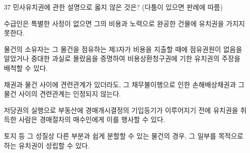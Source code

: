 \begin{question}{37}
민사유치권에 관한 설명으로 옳지 않은 것은? (다툼이 있으면 판례에 따름)
\begin{choices}
  \item 수급인은 특별한 사정이 없으면 그의 비용과 노력으로 완공한 건물에 유치권을 가지지 못한다.
  \item 물건의 소유자는 그 물건을 점유하는 제3자가 비용을 지출할 때에 점유권원이 없음을 알았거나 중대한 과실로 몰랐음을 증명하여 비용상환청구권에 기한 유치권의 주장을 배척할 수 있다.
  \item 채권과 물건 사이에 견련관계가 있더라도, 그 채무불이행으로 인한 손해배상채권과 그 물건 사이의 견련관계는 인정되지 않는다.
  \item 저당권의 실행으로 부동산에 경매개시결정의 기입등기가 이루어지기 전에 유치권을 취득한 사람은 경매절차의 매수인에게 이를 행사할 수 있다.
  \item 토지 등 그 성질상 다른 부분과 쉽게 분할할 수 있는 물건의 경우, 그 일부를 목적으로 하는 유치권이 성립할 수 있다.
\end{choices}
\end{question}

